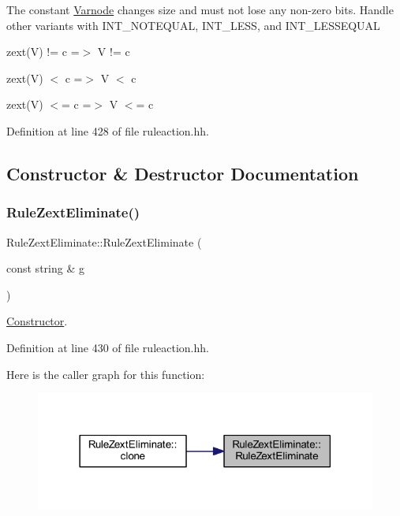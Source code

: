 The constant \mbox{\hyperlink{class_varnode}{Varnode}} changes size and must not lose any non-\/zero bits. Handle other variants with I\+N\+T\+\_\+\+N\+O\+T\+E\+Q\+U\+AL, I\+N\+T\+\_\+\+L\+E\+SS, and I\+N\+T\+\_\+\+L\+E\+S\+S\+E\+Q\+U\+AL
\begin{DoxyItemize}
\item {\ttfamily zext(\+V) != c =$>$ V != c}
\item {\ttfamily zext(\+V) $<$ c =$>$ V $<$ c}
\item {\ttfamily zext(\+V) $<$= c =$>$ V $<$= c} 
\end{DoxyItemize}

Definition at line 428 of file ruleaction.\+hh.



\subsection{Constructor \& Destructor Documentation}
\mbox{\label{class_rule_zext_eliminate_aded01c393e5d650e7e3a3bee3d1485dc}} 
\subsubsection{\texorpdfstring{RuleZextEliminate()}{RuleZextEliminate()}}
{\footnotesize\ttfamily Rule\+Zext\+Eliminate\+::\+Rule\+Zext\+Eliminate (\begin{DoxyParamCaption}\item[{const string \&}]{g }\end{DoxyParamCaption})\hspace{0.3cm}{\ttfamily [inline]}}



\mbox{\hyperlink{class_constructor}{Constructor}}. 



Definition at line 430 of file ruleaction.\+hh.

Here is the caller graph for this function\+:
\nopagebreak
\begin{figure}[H]
\begin{center}
\leavevmode
\includegraphics[width=318pt]{class_rule_zext_eliminate_aded01c393e5d650e7e3a3bee3d1485dc_icgraph}
\end{center}
\end{figure}


